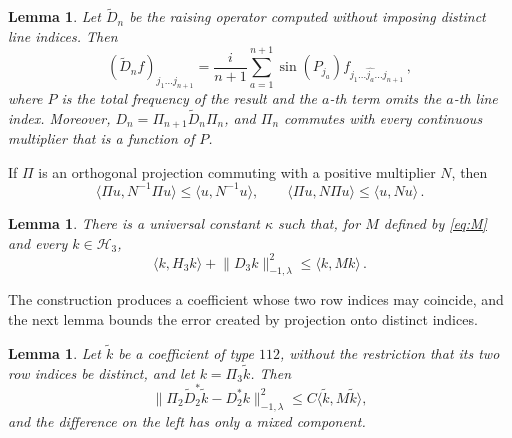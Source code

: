 \documentclass[11pt]{amsart}
\theoremstyle{plain}
\newtheorem{lemma}[theorem]{Lemma}
\theoremstyle{definition}
\newcommand{\1}{\mathbf 1}
\newcommand{\ip}[2]{\langle #1,#2\rangle}
\newcommand{\norm}[1]{\lVert #1\rVert}
\newcommand{\Hs}{\mathcal H}
\newcommand{\Hminus}[1]{\norm{#1}_{-1,\lambda}}
\begin{document}
\begin{lemma}\label{lem:raise}
Let $\widetilde D_n$ be the raising operator computed without imposing
distinct line indices.  Then
\begin{equation}\label{eq:raise}
  (\widetilde D_nf)_{j_1\dots j_{n+1}}
  =\frac i{n+1}\sum_{a=1}^{n+1}\sin(P_{j_a})
  f_{j_1\dots\widehat{j_a}\dots j_{n+1}}\, ,
\end{equation}
where $P$ is the total frequency of the result and the $a$-th term omits the
$a$-th line index.  Moreover,
$D_n=\Pi_{n+1}\widetilde D_n\Pi_n$, and $\Pi_n$ commutes with every
continuous multiplier that is a function of $P$.
\end{lemma}

If $\Pi$ is an orthogonal projection commuting with a positive multiplier
$N$, then
\begin{equation}\label{eq:contract}
  \ip{\Pi u}{N^{-1}\Pi u}\leq\ip u{N^{-1}u},\qquad
  \ip{\Pi u}{N\Pi u}\leq\ip u{Nu}\, .
\end{equation}

\begin{lemma}\label{lem:four}
There is a universal constant $\kappa$ such that, for $M$ defined by
\eqref{eq:M} and every $k\in\Hs_3$,
\begin{equation}\label{eq:four}
  \ip k{H_3k}+\Hminus{D_3k}^2\leq\ip k{Mk}\, .
\end{equation}
\end{lemma}

The construction produces a coefficient whose two row indices may coincide,
and the next lemma bounds the error created by projection onto distinct
indices.

\begin{lemma}\label{lem:distinct}
Let $\widetilde k$ be a coefficient of type $112$, without the restriction
that its two row indices be distinct, and let $k=\Pi_3\widetilde k$.  Then
\begin{equation}\label{eq:distinct}
  \Hminus{\Pi_2\widetilde D_2^*\widetilde k-D_2^*k}^2
  \leq C\ip{\widetilde k}{M\widetilde k},
\end{equation}
and the difference on the left has only a mixed component.
\end{lemma}
\end{document}
